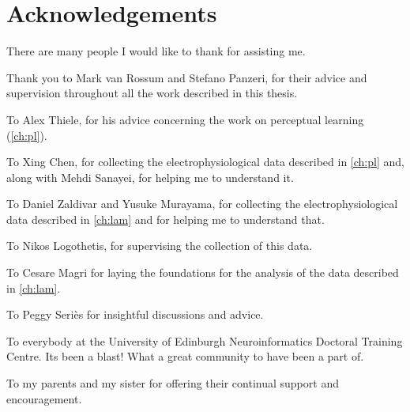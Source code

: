 

\begingroup

\let\clearpage\relax
\let\cleardoublepage\relax
\let\cleardoublepage\relax

\chapter*{Acknowledgements} %

There are many people I would like to thank for assisting me.

Thank you to Mark van Rossum and Stefano Panzeri, for their advice and supervision throughout all the work described in this thesis.

To Alex Thiele, for his advice concerning the work on perceptual learning (\autoref{ch:pl}).

To Xing Chen, for collecting the electrophysiological data described in \autoref{ch:pl} and, along with Mehdi Sanayei, for helping me to understand it.

To Daniel Zaldivar and Yusuke Murayama, for collecting the electrophysiological data described in \autoref{ch:lam} and for helping me to understand that.

To Nikos Logothetis, for supervising the collection of this data.

To Cesare Magri for laying the foundations for the analysis of the data described in \autoref{ch:lam}.

To Peggy Seri{\`e}s for insightful discussions and advice.

To everybody at the University of Edinburgh Neuroinformatics Doctoral Training Centre.
Its been a blast!
What a great community to have been a part of.

To my parents and my sister for offering their continual support and encouragement.

\endgroup
